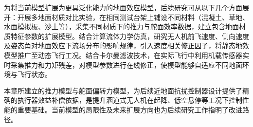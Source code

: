 为将当前模型扩展为更具泛化能力的地面效应模型，后续研究可从以下几个方面展开：开展多地面材质对比实验，在相同测试台架上铺设不同材料（混凝土、草地、水面模拟板、沙土等），采集不同材质下的推力与舵面效率数据，建立包含地面材质特征参数的扩展模型。结合计算流体力学仿真，研究无人机前飞速度、侧向速度及姿态角对地面效应下流场分布的影响规律，引入速度相关修正因子，将静态地效模型推广至动态飞行工况。结合卡尔曼滤波技术，在实际飞行中利用机载传感器实时采集推力和力矩残差，对模型参数进行在线修正，使模型能够自适应不同地面环境与飞行状态。

本章所建立的推力模型与舵面偏转力模型，为后续近地面抗扰控制器设计提供了精确的执行器效益补偿依据，是提升涵道式无人机在起降、低空悬停等工况下控制性能的重要基础。当前模型的局限性及未来扩展方向也为后续研究工作指明了改进路径。